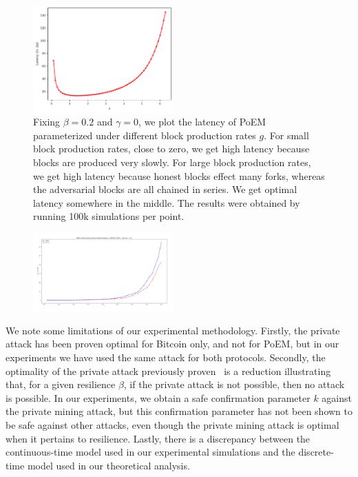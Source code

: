 \begin{figure}[pt]
    \centering
    \includegraphics[width = 0.48\textwidth]{figures/g_latency.pdf}

  \caption{Fixing $\beta=0.2$ and $\gamma=0$, we plot the latency of PoEM parameterized under different block production rates $g$.
          For small block production rates, close to zero, we get high latency because blocks are produced very slowly.
          For large block production rates, we get high latency because honest blocks effect many forks, whereas the adversarial blocks
          are all chained in series. We get optimal latency somewhere in the middle.
          The results were obtained by running 100k simulations per point.}
    \label{fig:g_latency}
\end{figure}

\begin{figure}[pt]
    \centering
    \includegraphics[width = 0.48\textwidth]{figures/bitcoin_vs_poem.png}

  \caption{}
    \label{fig:bitcoin_vs_poem}
\end{figure}

We note some limitations of our experimental methodology. Firstly, the private attack has been proven optimal
for Bitcoin only, and not for PoEM, but in our experiments we have used the same attack for both protocols.
Secondly, the optimality of the private attack previously proven~\cite{eiar} is a reduction illustrating
that, for a given resilience $\beta$, if the private attack is not possible, then no attack is possible.
In our experiments, we obtain a safe confirmation parameter $k$ against the private mining attack,
but this confirmation parameter has not been shown to be safe against other attacks, even though the private
mining attack is optimal when it pertains to resilience.
Lastly, there is a discrepancy between the continuous-time model used in our experimental simulations
and the discrete-time model used in our theoretical analysis.